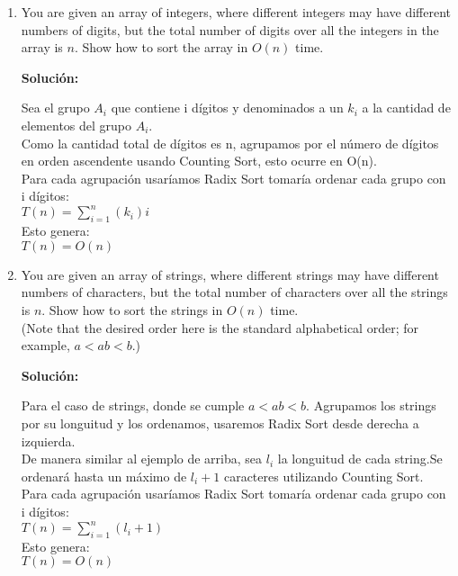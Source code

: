 \documentclass{article}
\begin{document}
\begin{enumerate}[label=(\alph*)]
  \item You are given an array of integers, where different integers may have different numbers of digits, but the total number of digits over all the integers in the array is $n$. Show how to sort the array in $O(n)$ time.
  
  \textbf{Solución:}
  
  Sea el grupo $A_i$ que contiene i dígitos y denominados a un $k_i$ a la cantidad de elementos del grupo $A_i$.\\
  Como la cantidad total de dígitos es n, agrupamos por el número de dígitos en orden ascendente usando Counting Sort, esto ocurre en O(n).\\
  Para cada agrupación usaríamos Radix Sort tomaría ordenar cada grupo con i dígitos:\\
  $T(n) = \sum_{i=1}^{n} (k_i) i$\\
  Esto genera:\\
  $T(n) = O(n)$\\

  
  \item You are given an array of strings, where different strings may have different numbers of characters, but the total number of characters over all the strings is $n$. Show how to sort the strings in $O(n)$ time.\\
(Note that the desired order here is the standard alphabetical order; for example, $a<ab<b$.)
  
  \textbf{Solución:}
  
  Para el caso de strings, donde se cumple $a<ab<b$. Agrupamos los strings por su longuitud y los ordenamos, usaremos Radix Sort desde derecha a izquierda.\\
  De manera similar al ejemplo de arriba, sea $l_i$ la longuitud de cada string.Se ordenará hasta un máximo de $l_i +1$ caracteres utilizando Counting Sort.\\
  Para cada agrupación usaríamos Radix Sort tomaría ordenar cada grupo con i dígitos:\\
  $T(n) = \sum_{i=1}^{n} (l_i + 1)$\\
  Esto genera:\\
  $T(n) = O(n)$\\

\end{enumerate}


\end{document}
